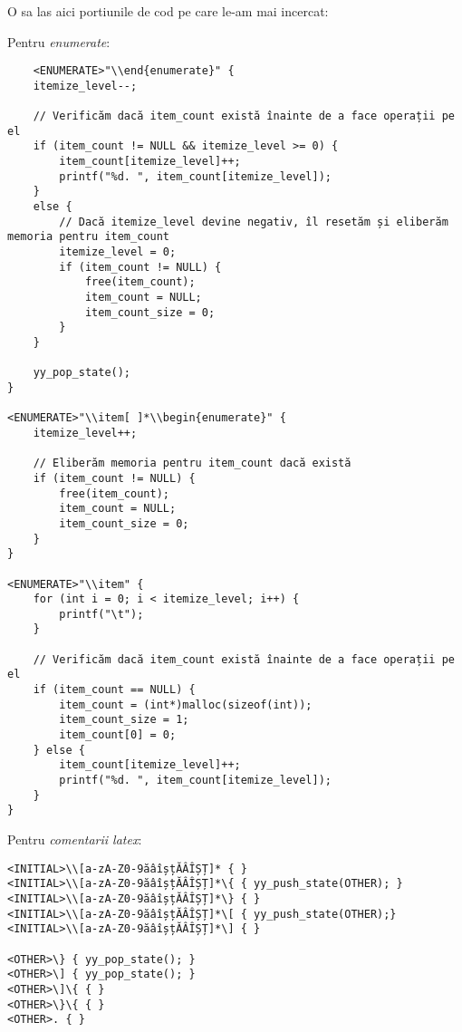 O sa las aici portiunile de cod pe care le-am mai incercat:

Pentru \textit{enumerate}:
\begin{verbatim}
    <ENUMERATE>"\\end{enumerate}" {
    itemize_level--;

    // Verificăm dacă item_count există înainte de a face operații pe el
    if (item_count != NULL && itemize_level >= 0) {
        item_count[itemize_level]++;
        printf("%d. ", item_count[itemize_level]);
    }
    else {
        // Dacă itemize_level devine negativ, îl resetăm și eliberăm memoria pentru item_count
        itemize_level = 0;
        if (item_count != NULL) {
            free(item_count);
            item_count = NULL;
            item_count_size = 0;
        }
    }

    yy_pop_state();
}

<ENUMERATE>"\\item[ ]*\\begin{enumerate}" {
    itemize_level++;

    // Eliberăm memoria pentru item_count dacă există
    if (item_count != NULL) {
        free(item_count);
        item_count = NULL;
        item_count_size = 0;
    }
}

<ENUMERATE>"\\item" {
    for (int i = 0; i < itemize_level; i++) {
        printf("\t");
    }

    // Verificăm dacă item_count există înainte de a face operații pe el
    if (item_count == NULL) {
        item_count = (int*)malloc(sizeof(int));
        item_count_size = 1;
        item_count[0] = 0;
    } else {
        item_count[itemize_level]++;
        printf("%d. ", item_count[itemize_level]);
    }
}
\end{verbatim}

Pentru \textit{comentarii latex}:
\begin{verbatim}
<INITIAL>\\[a-zA-Z0-9ăâîșțĂÂÎȘȚ]* { }
<INITIAL>\\[a-zA-Z0-9ăâîșțĂÂÎȘȚ]*\{ { yy_push_state(OTHER); }
<INITIAL>\\[a-zA-Z0-9ăâîșțĂÂÎȘȚ]*\} { }
<INITIAL>\\[a-zA-Z0-9ăâîșțĂÂÎȘȚ]*\[ { yy_push_state(OTHER);}
<INITIAL>\\[a-zA-Z0-9ăâîșțĂÂÎȘȚ]*\] { }

<OTHER>\} { yy_pop_state(); }
<OTHER>\] { yy_pop_state(); }
<OTHER>\]\{ { }
<OTHER>\}\{ { }
<OTHER>. { }
\end{verbatim}